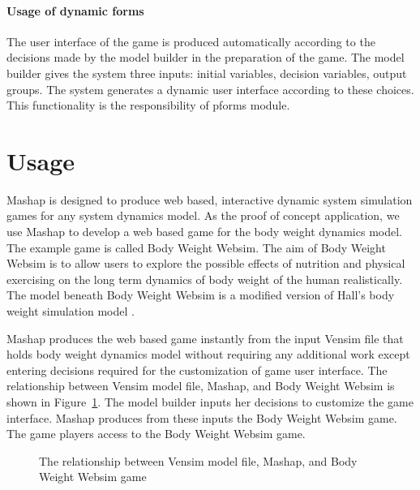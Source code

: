 \documentclass[12pt,a4paper]{paper}
\begin{document}
\paragraph{Usage of dynamic forms}
The user interface of the game is produced  automatically according to the decisions made by the model builder in the preparation of the game. The model builder gives the system three inputs: initial variables, decision variables, output groups. The system generates a dynamic user interface according to these choices. This functionality is the responsibility of pforms module.

\section{Usage}

Mashap is designed to produce web based, interactive dynamic system simulation games for any system dynamics model. As the proof of concept application, we use Mashap to develop a web based game for the body weight dynamics model. The example game is called Body Weight Websim. The aim of Body Weight Websim is to allow users to explore the possible effects of nutrition and physical exercising on the long term dynamics of body weight of the human realistically. The model beneath Body Weight Websim is a modified version of Hall's body weight simulation model \cite{Hall2006}.

Mashap produces the web based game instantly from the input Vensim file that holds body weight dynamics model without requiring any additional work except entering decisions required for the customization of game user interface. The relationship between Vensim model file, Mashap, and Body Weight Websim is shown in Figure~\ref{fig:mashap_and_body_weight_websim}. The model builder inputs her decisions to customize the game interface. Mashap produces from these inputs the Body Weight Websim game. The game players access to the Body Weight Websim game. \\ 

\begin{figure}
	\centering
\caption{The relationship between Vensim model file, Mashap, and Body Weight Websim game}%
\label{fig:mashap_and_body_weight_websim}%
\end{figure}
\end{document}
